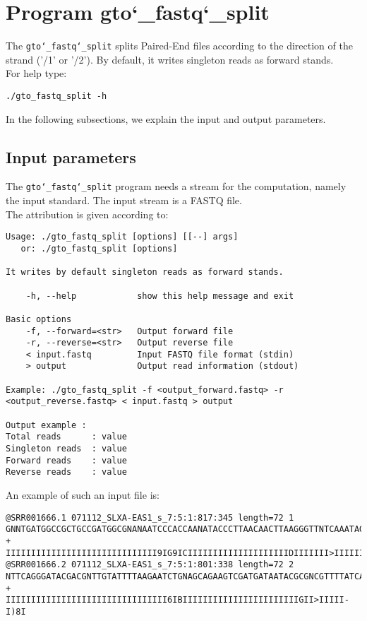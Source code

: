 \section{Program gto\char`_fastq\char`_split}
The \texttt{gto\char`_fastq\char`_split} splits Paired-End files according to the direction of the strand ('/1' or '/2'). By default, it writes singleton reads as forward stands. \\
For help type:
\begin{lstlisting}
./gto_fastq_split -h
\end{lstlisting}
In the following subsections, we explain the input and output parameters.

\subsection*{Input parameters}

The \texttt{gto\char`_fastq\char`_split} program needs a stream for the computation, namely the input standard. The input stream is a FASTQ file.\\
The attribution is given according to:
\begin{lstlisting}
Usage: ./gto_fastq_split [options] [[--] args]
   or: ./gto_fastq_split [options]

It writes by default singleton reads as forward stands.

    -h, --help            show this help message and exit

Basic options
    -f, --forward=<str>   Output forward file
    -r, --reverse=<str>   Output reverse file
    < input.fastq         Input FASTQ file format (stdin)
    > output         	  Output read information (stdout)

Example: ./gto_fastq_split -f <output_forward.fastq> -r <output_reverse.fastq> < input.fastq > output

Output example :
Total reads      : value
Singleton reads  : value
Forward reads    : value
Reverse reads    : value
\end{lstlisting}
An example of such an input file is:
\begin{lstlisting}
@SRR001666.1 071112_SLXA-EAS1_s_7:5:1:817:345 length=72 1
GNNTGATGGCCGCTGCCGATGGCGNANAATCCCACCAANATACCCTTAACAACTTAAGGGTTNTCAAATAGA
+
IIIIIIIIIIIIIIIIIIIIIIIIIIIIII9IG9ICIIIIIIIIIIIIIIIIIIIIDIIIIIII>IIIIII/
@SRR001666.2 071112_SLXA-EAS1_s_7:5:1:801:338 length=72 2
NTTCAGGGATACGACGNTTGTATTTTAAGAATCTGNAGCAGAAGTCGATGATAATACGCGNCGTTTTATCAN
+
IIIIIIIIIIIIIIIIIIIIIIIIIIIIIIII6IBIIIIIIIIIIIIIIIIIIIIIIIGII>IIIII-I)8I
\end{lstlisting}

